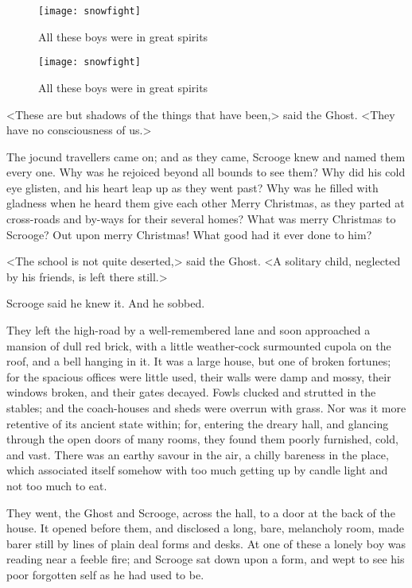 \begin{letter}
	\begin{figure}[tbh]
		\centering
		\texttt{[image: snowfight]}
		\caption{All these boys were in great spirits}
	\end{figure}
\end{letter}

\begin{a4}
	\begin{figure}[tbh]
		\centering
		\texttt{[image: snowfight]}
		\caption{All these boys were in great spirits}
	\end{figure}
\end{a4}



<These are but shadows of the things that have been,> said the Ghost. <They have no consciousness of us.>

The jocund travellers came on; and as they came, Scrooge knew and named them every one. Why was he rejoiced beyond all  bounds to see them? Why did his cold eye glisten, and his heart leap up as they went past? Why was he filled with gladness when he heard them give each other Merry Christmas, as they parted at cross-roads and by-ways for their several homes? What was merry Christmas to Scrooge? Out upon merry Christmas! What good had it ever done to him?

<The school is not quite deserted,> said the Ghost. <A solitary child, neglected by his friends, is left there still.>

Scrooge said he knew it. And he sobbed.

They left the high-road by a well-remembered lane and soon approached a mansion of dull red brick, with a little weather-cock surmounted cupola on the roof, and a bell hanging in it. It was a large house, but one of broken fortunes; for the spacious offices were little used, their walls were damp and mossy, their windows broken, and their gates decayed. Fowls clucked and strutted in the stables; and the coach-houses and sheds were overrun with grass. Nor was it more retentive of its ancient state within; for, entering the dreary hall, and glancing through the open doors of many rooms, they found them poorly furnished, cold, and vast. There was an earthy savour in the air, a chilly bareness in the place, which associated itself somehow with too much getting up by candle light and not too much to eat.

They went, the Ghost and Scrooge, across the hall, to a door at the back of the house. It opened before them, and disclosed a long, bare, melancholy room, made barer still by lines of plain deal forms and desks. At one of these a lonely boy was reading near a feeble fire; and Scrooge sat down upon a form, and wept to see his poor forgotten self as he had used to be.


